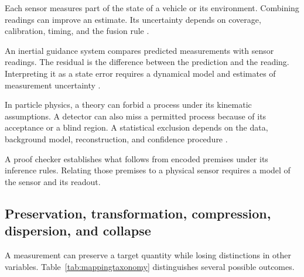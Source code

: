 Each sensor measures part of the state of a vehicle or its environment. Combining readings can improve an estimate. Its uncertainty depends on coverage, calibration, timing, and the fusion rule \parencite{HallLlinas1997,DurrantWhyteHenderson2008}.

An inertial guidance system compares predicted measurements with sensor readings. The residual is the difference between the prediction and the reading. Interpreting it as a state error requires a dynamical model and estimates of measurement uncertainty \parencite{Kalman1963,HallLlinas1997,TittertonWeston2004}.

In particle physics, a theory can forbid a process under its kinematic assumptions. A detector can also miss a permitted process because of its acceptance or a blind region. A statistical exclusion depends on the data, background model, reconstruction, and confidence procedure \parencite{Cowan2011,ParticleDataGroup2026}.

A proof checker establishes what follows from encoded premises under its inference rules. Relating those premises to a physical sensor requires a model of the sensor and its readout.

\subsection{Preservation, transformation, compression, dispersion, and collapse}

A measurement can preserve a target quantity while losing distinctions in other variables. Table~\ref{tab:mappingtaxonomy} distinguishes several possible outcomes.

